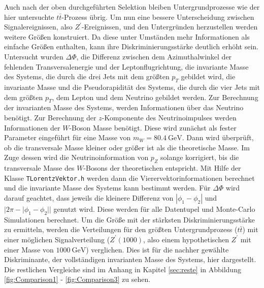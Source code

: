 Auch nach der oben durchgeführten Selektion bleiben Untergrundprozesse wie der hier untersuchte $t\bar{t}$-Prozess übrig.
Um nun eine bessere Unterscheidung zwischen Signalereignissen, also $Z^\prime$-Ereignissen, und den Untergründen herzustellen werden weitere Größen konstruiert.
Da diese unter Umständen mehr Informationen als einfache Größen enthalten, kann ihre Diskriminierungsstärke deutlich erhöht sein.
Untersucht wurden $\Delta\Phi$, die Differenz zwischen dem Azimuthalwinkel der fehlenden Transversalenergie und der Leptonflugrichtung, die invariante Masse des Systems, die durch die drei Jets mit dem größten $p_T$ gebildet wird, die invariante Masse und die Pseudorapidität des Systems, die durch die vier Jets mit dem größten $p_T$, dem Lepton und dem Neutrino gebildet werden.
Zur Berechnung der invarianten Masse des Systems, werden Informationen über das Neutrino benötigt. Zur Berechnung der $z$-Komponente des Neutrinoimpulses werden 
Informationen der $W$-Boson Masse benötigt. Diese wird zunächst als fester Parameter eingeführt für eine 
Masse von $m_W = \SI{80.4}{\giga\electronvolt}$. Dann wird überprüft, ob die transversale Masse kleiner oder größer ist als die theoretische 
Masse. Im Zuge dessen wird die Neutrinoinformation von $p_Z$ solange korrigiert, bis die transversale Masse des $W$-Bosons der theoretischen entspricht. 
Mit Hilfe der Klasse \texttt{TLorentzVektor.h} werden dann die Vierervektorinformationen berechnet und die invariante Masse des Systems kann bestimmt werden.
Für $\Delta\Phi$ wird darauf geachtet, dass jeweils die kleinere Differenz von $|\phi_1 - \phi_2|$ und $|2\pi - |\phi_1 - \phi_2||$ genutzt wird.
Diese werden für alle Datentupel und Monte-Carlo Simulationen berechnet.
Um die Größe mit der stärksten Diskriminierungsstärke zu ermitteln, werden die Verteilungen für den größten Untergrundprozess ($t\bar{t}$) mit einer möglichen Signalverteilung ($Z^\prime(1000)$, also einem hypothetischen $Z^\prime$ mit einer Masse von $\SI{1000}{\giga\electronvolt}$) verglichen.
Dies ist für die nachher gewählte Diskriminante, der vollständigen invarianten Masse des Systems, hier dargestellt.
Die restlichen Vergleiche sind im Anhang in Kapitel \ref{sec:reste} in Abbildung \ref{fig:Comparison1} - \ref{fig:Comparison3} zu sehen.

